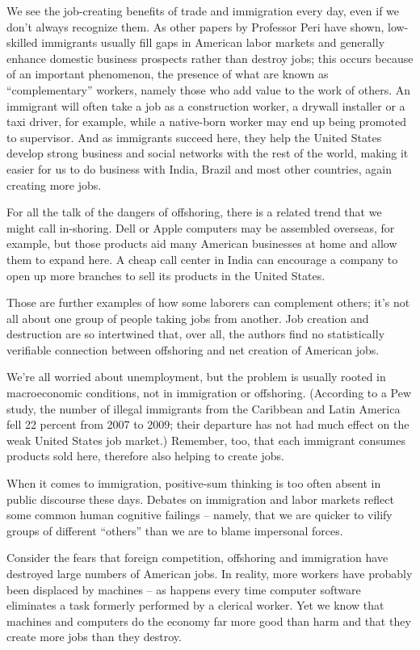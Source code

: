 ﻿\documentclass[12pt]{article}
\begin{document}
We see the job-creating benefits of trade and immigration every day, even if we don't always
recognize them. As other papers by Professor Peri have shown, low-skilled immigrants usually fill
gaps in American labor markets and generally enhance domestic business prospects rather than destroy
jobs; this occurs because of an important phenomenon, the presence of what are known as
``complementary'' workers, namely those who add value to the work of others. An immigrant will often
take a job as a construction worker, a drywall installer or a taxi driver, for example, while a
native-born worker may end up being promoted to supervisor. And as immigrants succeed here, they
help the United States develop strong business and social networks with the rest of the world,
making it easier for us to do business with India, Brazil and most other countries, again creating
more jobs.

For all the talk of the dangers of offshoring, there is a related trend that we might call
in-shoring. Dell or Apple computers may be assembled overseas, for example, but those products aid
many American businesses at home and allow them to expand here. A cheap call center in India can
encourage a company to open up more branches to sell its products in the United States.

Those are further examples of how some laborers can complement others; it's not all about one group
of people taking jobs from another. Job creation and destruction are so intertwined that, over all,
the authors find no statistically verifiable connection between offshoring and net creation of
American jobs.

We're all worried about unemployment, but the problem is usually rooted in macroeconomic conditions,
not in immigration or offshoring. (According to a Pew study, the number of illegal immigrants from
the Caribbean and Latin America fell 22 percent from 2007 to 2009; their departure has not had much
effect on the weak United States job market.) Remember, too, that each immigrant consumes products
sold here, therefore also helping to create jobs.

When it comes to immigration, positive-sum thinking is too often absent in public discourse these
days. Debates on immigration and labor markets reflect some common human cognitive failings --
namely, that we are quicker to vilify groups of different ``others'' than we are to blame impersonal
forces.

Consider the fears that foreign competition, offshoring and immigration have destroyed large numbers
of American jobs. In reality, more workers have probably been displaced by machines -- as happens
every time computer software eliminates a task formerly performed by a clerical worker. Yet we know
that machines and computers do the economy far more good than harm and that they create more jobs
than they destroy.
\end{document}
